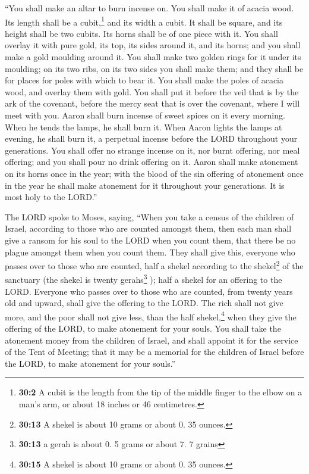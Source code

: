  ``You shall make an altar to burn incense on. You shall
make it of acacia wood.  Its length shall be a
cubit,\footnote{\textbf{30:2} A cubit is the length from the tip of the
  middle finger to the elbow on a man's arm, or about 18 inches or 46
  centimetres.} and its width a cubit. It shall be square, and its
height shall be two cubits. Its horns shall be of one piece with it.
 You shall overlay it with pure gold, its top, its sides
around it, and its horns; and you shall make a gold moulding around it.
 You shall make two golden rings for it under its
moulding; on its two ribs, on its two sides you shall make them; and
they shall be for places for poles with which to bear it. 
You shall make the poles of acacia wood, and overlay them with gold.
 You shall put it before the veil that is by the ark of
the covenant, before the mercy seat that is over the covenant, where I
will meet with you.  Aaron shall burn incense of sweet
spices on it every morning. When he tends the lamps, he shall burn it.
 When Aaron lights the lamps at evening, he shall burn it,
a perpetual incense before the LORD throughout your generations.
 You shall offer no strange incense on it, nor burnt
offering, nor meal offering; and you shall pour no drink offering on it.
 Aaron shall make atonement on its horns once in the
year; with the blood of the sin offering of atonement once in the year
he shall make atonement for it throughout your generations. It is most
holy to the LORD.''

 The LORD spoke to Moses, saying,  ``When
you take a census of the children of Israel, according to those who are
counted amongst them, then each man shall give a ransom for his soul to
the LORD when you count them, that there be no plague amongst them when
you count them.  They shall give this, everyone who
passes over to those who are counted, half a shekel according to the
shekel\footnote{\textbf{30:13} A shekel is about 10 grams or about 0. 35
  ounces.} of the sanctuary (the shekel is twenty gerahs\footnote{\textbf{30:13}
  a gerah is about 0. 5 grams or about 7. 7 grains} ); half a shekel for
an offering to the LORD.  Everyone who passes over to
those who are counted, from twenty years old and upward, shall give the
offering to the LORD.  The rich shall not give more, and
the poor shall not give less, than the half shekel,\footnote{\textbf{30:15}
  A shekel is about 10 grams or about 0. 35 ounces.} when they give the
offering of the LORD, to make atonement for your souls. 
You shall take the atonement money from the children of Israel, and
shall appoint it for the service of the Tent of Meeting; that it may be
a memorial for the children of Israel before the LORD, to make atonement
for your souls.''

